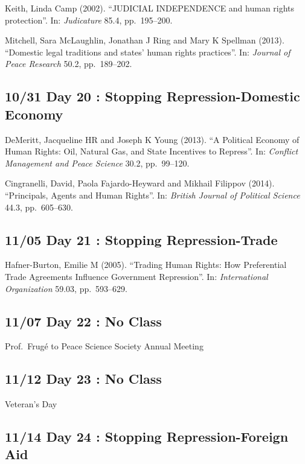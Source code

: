 \documentclass[11pt,]{article}
\begin{document}
Keith, Linda Camp (2002). ``JUDICIAL INDEPENDENCE and human rights
protection''. In: \emph{Judicature} 85.4, pp.~195--200.

Mitchell, Sara McLaughlin, Jonathan J Ring and Mary K Spellman (2013).
``Domestic legal traditions and states' human rights practices''. In:
\emph{Journal of Peace Research} 50.2, pp.~189--202.

\hypertarget{day-20-stopping-repression-domestic-economy}{%
\subsection{10/31 Day 20 : Stopping Repression-Domestic
Economy}\label{day-20-stopping-repression-domestic-economy}}

DeMeritt, Jacqueline HR and Joseph K Young (2013). ``A Political Economy
of Human Rights: Oil, Natural Gas, and State Incentives to Repress''.
In: \emph{Conflict Management and Peace Science} 30.2, pp.~99--120.

Cingranelli, David, Paola Fajardo-Heyward and Mikhail Filippov (2014).
``Principals, Agents and Human Rights''. In:
\emph{British Journal of Political Science} 44.3, pp.~605--630.

\hypertarget{day-21-stopping-repression-trade}{%
\subsection{11/05 Day 21 : Stopping
Repression-Trade}\label{day-21-stopping-repression-trade}}

Hafner-Burton, Emilie M (2005). ``Trading Human Rights: How Preferential
Trade Agreements Influence Government Repression''. In:
\emph{International Organization} 59.03, pp.~593--629.

\hypertarget{day-22-no-class}{%
\subsection{11/07 Day 22 : No Class}\label{day-22-no-class}}

Prof.~Frugé to Peace Science Society Annual Meeting

\hypertarget{day-23-no-class}{%
\subsection{11/12 Day 23 : No Class}\label{day-23-no-class}}

Veteran's Day

\hypertarget{day-24-stopping-repression-foreign-aid}{%
\subsection{11/14 Day 24 : Stopping Repression-Foreign
Aid}\label{day-24-stopping-repression-foreign-aid}}
\end{document}
